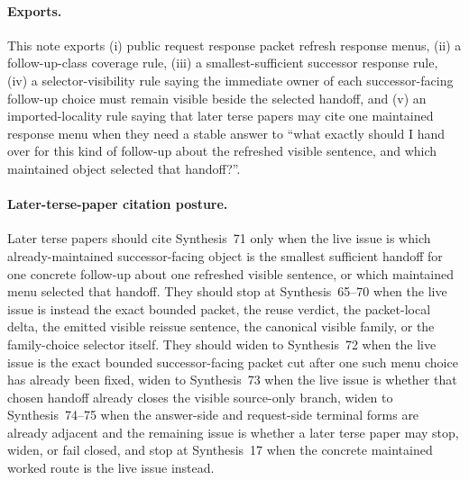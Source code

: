 \documentclass[11pt]{article}
\begin{document}
\paragraph{Exports.}
This note exports (i) public request response packet refresh response menus, (ii) a follow-up-class coverage rule, (iii) a smallest-sufficient successor response rule, (iv) a selector-visibility rule saying the immediate owner of each successor-facing follow-up choice must remain visible beside the selected handoff, and (v) an imported-locality rule saying that later terse papers may cite one maintained response menu when they need a stable answer to ``what exactly should I hand over for this kind of follow-up about the refreshed visible sentence, and which maintained object selected that handoff?''.

\paragraph{Later-terse-paper citation posture.}
Later terse papers should cite Synthesis~71 only when the live issue is which already-maintained successor-facing object is the smallest sufficient handoff for one concrete follow-up about one refreshed visible sentence, or which maintained menu selected that handoff. They should stop at Synthesis~65--70 when the live issue is instead the exact bounded packet, the reuse verdict, the packet-local delta, the emitted visible reissue sentence, the canonical visible family, or the family-choice selector itself. They should widen to Synthesis~72 when the live issue is the exact bounded successor-facing packet cut after one such menu choice has already been fixed, widen to Synthesis~73 when the live issue is whether that chosen handoff already closes the visible source-only branch, widen to Synthesis~74--75 when the answer-side and request-side terminal forms are already adjacent and the remaining issue is whether a later terse paper may stop, widen, or fail closed, and stop at Synthesis~17 when the concrete maintained worked route is the live issue instead.\cite{series:publicrequestresponsepacketrefreshresponsepackets,series:publicrequestresponsepacketrefreshresponsepacketclosureverdicts,series:pairedterminalcitationdiscipline,series:pairedterminalcutoverrule,series:workedexample}
\end{document}
